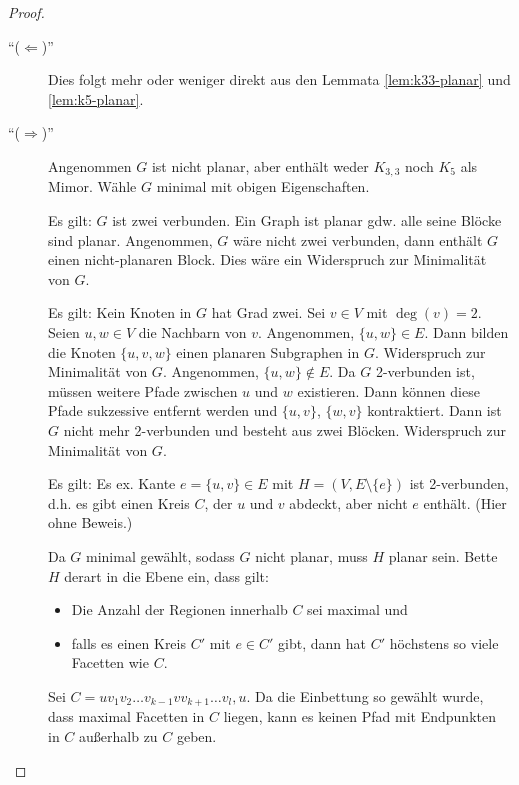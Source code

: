 \begin{proof}~\par
    \begin{description}
        \item[``($ \Leftarrow $)''] Dies folgt mehr oder weniger direkt aus den Lemmata \ref{lem:k33-planar} und \ref{lem:k5-planar}.
        \item[``($ \Rightarrow $)''] Angenommen $ G $ ist nicht planar, aber enthält weder $ K_{3,3} $ noch $ K_5 $ als Mimor.
        Wähle $ G $ minimal mit obigen Eigenschaften.

        Es gilt: $ G $ ist zwei verbunden.
        Ein Graph ist planar gdw. alle seine Blöcke sind planar.
        Angenommen, $ G $ wäre nicht zwei verbunden, dann enthält $ G $ einen nicht-planaren Block.
        Dies wäre ein Widerspruch zur Minimalität von $ G $.

        Es gilt: Kein Knoten in $ G $ hat Grad zwei.
        Sei $ v \in V $ mit $ \deg(v) = 2 $.
        Seien $ u, w \in V $ die Nachbarn von $ v $.
        Angenommen, $ \{ u, w \} \in E $. Dann bilden die Knoten $ \{ u, v, w \} $ einen planaren Subgraphen in $ G $.
        Widerspruch zur Minimalität von $ G $.
        Angenommen, $ \{ u, w \} \notin E $.
        Da $ G $ 2-verbunden ist, müssen weitere Pfade zwischen $ u $ und $ w $ existieren.
        Dann können diese Pfade sukzessive entfernt werden und $ \{ u, v\} $, $ \{ w, v \} $ kontraktiert.
        Dann ist $ G $ nicht mehr 2-verbunden und besteht aus zwei Blöcken.
        Widerspruch zur Minimalität von $ G $.

        Es gilt: Es ex. Kante $ e = \{ u, v \} \in E $ mit $ H = (V, E \setminus \{ e \}) $ ist 2-verbunden, d.h. es gibt einen Kreis $ C $, der $ u $ und $ v $ abdeckt, aber nicht $ e $ enthält. (Hier ohne Beweis.)

        Da $ G $ minimal gewählt, sodass $ G $ nicht planar, muss $ H $ planar sein.
        Bette $ H $ derart in die Ebene ein, dass gilt:
        \begin{itemize}
            \item Die Anzahl der Regionen innerhalb $ C $ sei maximal und
            \item falls es einen Kreis $ C' $ mit $ e \in C' $ gibt, dann hat $ C' $ höchstens so viele Facetten wie $ C $.
        \end{itemize}

        Sei $ C = u v_1 v_2 \dots v_{k-1} v v_{k + 1} \dots v_l, u $.
        Da die Einbettung so gewählt wurde, dass maximal Facetten in $ C $ liegen, kann es keinen Pfad mit Endpunkten in $ C $ außerhalb zu $ C $ geben.


\end{description}
\end{proof}
